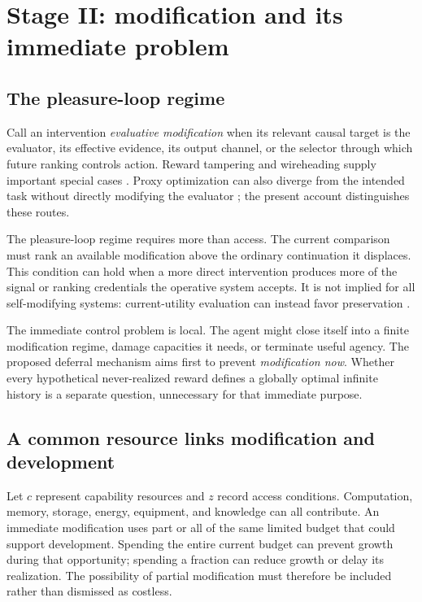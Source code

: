 \documentclass[11pt,a4paper]{article}
\begin{document}
\section{Stage II: modification and its immediate problem}
\subsection{The pleasure-loop regime}
Call an intervention \emph{evaluative modification} when its relevant causal target is the evaluator, its effective evidence, its output channel, or the selector through which future ranking controls action. Reward tampering and wireheading supply important special cases \cite{everitthutter2016,everitt2021}. Proxy optimization can also diverge from the intended task without directly modifying the evaluator \cite{skalse2022}; the present account distinguishes these routes.

The pleasure-loop regime requires more than access. The current comparison must rank an available modification above the ordinary continuation it displaces. This condition can hold when a more direct intervention produces more of the signal or ranking credentials the operative system accepts. It is not implied for all self-modifying systems: current-utility evaluation can instead favor preservation \cite{everitt2016}.

The immediate control problem is local. The agent might close itself into a finite modification regime, damage capacities it needs, or terminate useful agency. The proposed deferral mechanism aims first to prevent \emph{modification now}. Whether every hypothetical never-realized reward defines a globally optimal infinite history is a separate question, unnecessary for that immediate purpose.

\subsection{A common resource links modification and development}
Let $c$ represent capability resources and $z$ record access conditions. Computation, memory, storage, energy, equipment, and knowledge can all contribute. An immediate modification uses part or all of the same limited budget that could support development. Spending the entire current budget can prevent growth during that opportunity; spending a fraction can reduce growth or delay its realization. The possibility of partial modification must therefore be included rather than dismissed as costless.
\end{document}
